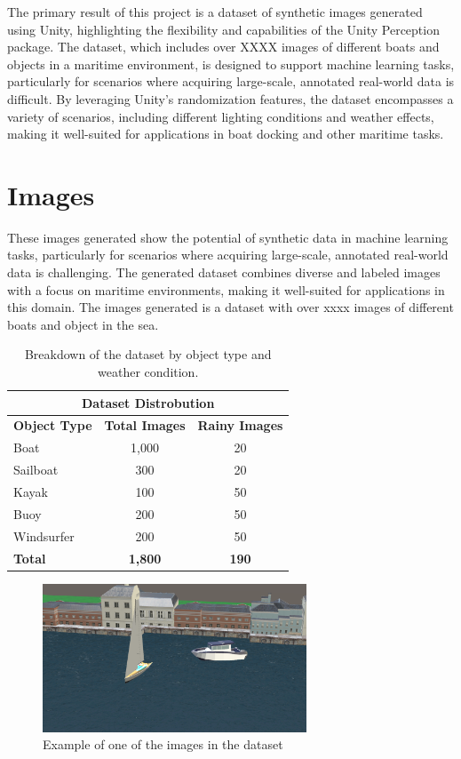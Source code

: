 The primary result of this project is a dataset of synthetic images generated using Unity, highlighting the flexibility and capabilities of the Unity Perception package. The dataset, which includes over XXXX images of different boats and objects in a maritime environment, is designed to support machine learning tasks, particularly for scenarios where acquiring large-scale, annotated real-world data is difficult. By leveraging Unity's randomization features, the dataset encompasses a variety of scenarios, including different lighting conditions and weather effects, making it well-suited for applications in boat docking and other maritime tasks.

\section{Images}
 These images generated show the potential of synthetic data in machine learning tasks, particularly for scenarios where acquiring large-scale, annotated real-world data is challenging. The generated dataset combines diverse and labeled images with a focus on maritime environments, making it well-suited for applications in this domain. The images generated is a dataset with over xxxx images of different boats and object in the sea. 
\begin{table}[H]
\centering
\begin{tabular}{|l|c|c|}
\hline
\multicolumn{3}{|c|}{\textbf{Dataset Distrobution}} \\ 
\hline
\textbf{Object Type} & \textbf{Total Images} & \textbf{Rainy Images} \\ 
\hline
Boat         & 1,000  & 20  \\ 
Sailboat     & 300    & 20  \\ 
Kayak        & 100    & 50  \\ 
Buoy         & 200    & 50  \\ 
Windsurfer   & 200    & 50  \\ 
\hline
\textbf{Total}       & \textbf{1,800} & \textbf{190} \\ 
\hline
\end{tabular}
\caption{Breakdown of the dataset by object type and weather condition.}
\label{tab:dataset_composition}
\end{table}



\begin{figure}[H]
\centering
\includegraphics[width=0.7\textwidth]{Figures/rgb_2.png}
\caption{Example of one of the images in the dataset}
\label{fig:original_image}
\end{figure}


